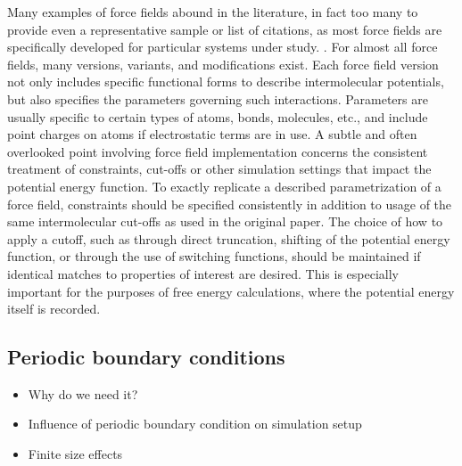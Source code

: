 \documentclass[9pt,bestpractices]{livecoms}
\begin{document}
Many examples of force fields abound in the literature, in fact too many to provide 
even a representative sample or list of citations, as most force fields are 
specifically developed for particular systems under study.
.
For almost all force fields, many versions, variants, and 
modifications exist. Each force field version not only includes specific functional 
forms to describe intermolecular potentials, but also specifies the parameters 
governing such interactions. Parameters are usually specific to certain types 
of atoms, bonds, molecules, etc., and include point charges on atoms if 
electrostatic terms are in use. A subtle and often overlooked point involving 
force field implementation concerns the consistent treatment of constraints, 
cut-offs or other simulation settings that impact the potential energy 
function. To exactly replicate a described parametrization of a force field, 
constraints should be specified consistently in addition to usage of the same 
intermolecular cut-offs as used in the original paper. The choice of how to 
apply a cutoff, such as through direct truncation, shifting of the potential 
energy function, or through the use of switching functions, should be 
maintained if identical matches to properties of interest are desired. This is 
especially important for the purposes of free energy calculations, where the 
potential energy itself is recorded.


\subsection{Periodic boundary conditions}
\label{sec:periodic}
\begin{itemize}
\item Why do we need it?
\item Influence of periodic boundary condition on simulation setup
\item Finite size effects
\end{itemize}
\end{document}

